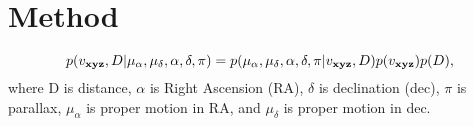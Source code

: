 \section{Method}

\begin{equation}
p(v_{\bf xyz}, D | \mu_{\alpha}, \mu_{\delta}, \alpha, \delta, \pi) =
    p(\mu_{\alpha}, \mu_{\delta}, \alpha, \delta, \pi | v_{\bf xyz}, D)
    p(v_{\bf xyz}) p(D),
\end{equation}
where D is distance, $\alpha$ is Right Ascension (RA), $\delta$ is declination
(dec), $\pi$ is parallax, $\mu_\alpha$ is proper motion in RA, and
$\mu_\delta$ is proper motion in dec.


